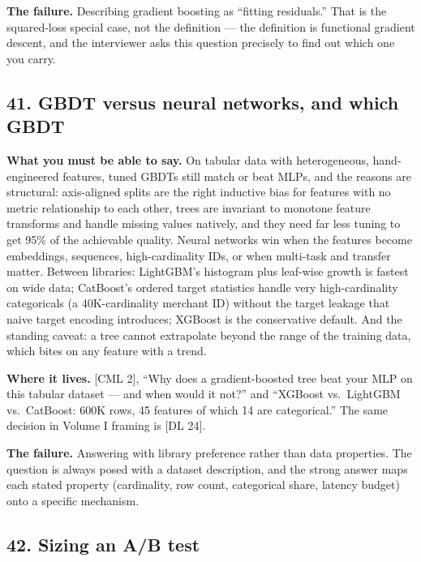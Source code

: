 \textbf{The failure.} Describing gradient boosting as ``fitting residuals.'' That is the squared-loss special case, not the definition --- the definition is functional gradient descent, and the interviewer asks this question precisely to find out which one you carry.

\subsection*{41. GBDT versus neural networks, and which GBDT}

\textbf{What you must be able to say.} On tabular data with heterogeneous, hand-engineered features, tuned GBDTs still match or beat MLPs, and the reasons are structural: axis-aligned splits are the right inductive bias for features with no metric relationship to each other, trees are invariant to monotone feature transforms and handle missing values natively, and they need far less tuning to get 95\% of the achievable quality. Neural networks win when the features become embeddings, sequences, high-cardinality IDs, or when multi-task and transfer matter. Between libraries: LightGBM's histogram plus leaf-wise growth is fastest on wide data; CatBoost's ordered target statistics handle very high-cardinality categoricals (a 40K-cardinality merchant ID) without the target leakage that naive target encoding introduces; XGBoost is the conservative default. And the standing caveat: a tree cannot extrapolate beyond the range of the training data, which bites on any feature with a trend.

\textbf{Where it lives.} [CML 2], ``Why does a gradient-boosted tree beat your MLP on this tabular dataset --- and when would it not?'' and ``XGBoost vs.\ LightGBM vs.\ CatBoost: 600K rows, 45 features of which 14 are categorical.'' The same decision in Volume I framing is [DL 24].

\textbf{The failure.} Answering with library preference rather than data properties. The question is always posed with a dataset description, and the strong answer maps each stated property (cardinality, row count, categorical share, latency budget) onto a specific mechanism.

\subsection*{42. Sizing an A/B test}

